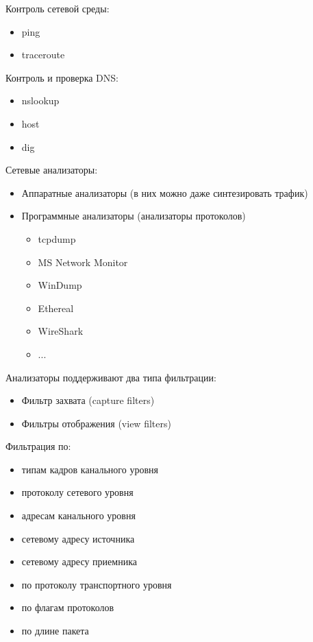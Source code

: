 Контроль сетевой среды:
\begin{itemize}
    \item ping
    \item traceroute
\end{itemize}

Контроль и проверка DNS:
\begin{itemize}
    \item nslookup
    \item host
    \item dig
\end{itemize}


Сетевые анализаторы:
\begin{itemize}
    \item Аппаратные анализаторы (в них можно даже синтезировать трафик)
    \item Программные анализаторы (анализаторы протоколов)
    \begin{itemize}
        \item tcpdump
        \item MS Network Monitor
        \item WinDump
        \item Ethereal
        \item WireShark
        \item ...
    \end{itemize}
\end{itemize}

Анализаторы поддерживают два типа фильтрации:
\begin{itemize}
    \item Фильтр захвата (capture filters)
    \item Фильтры отображения (view filters)
\end{itemize}

Фильтрация по:
\begin{itemize}
    \item типам кадров канального уровня
    \item протоколу сетевого уровня
    \item адресам канального уровня
    \item сетевому адресу источника
    \item сетевому адресу приемника
    \item по протоколу транспортного уровня
    \item по флагам протоколов
    \item по длине пакета
\end{itemize}